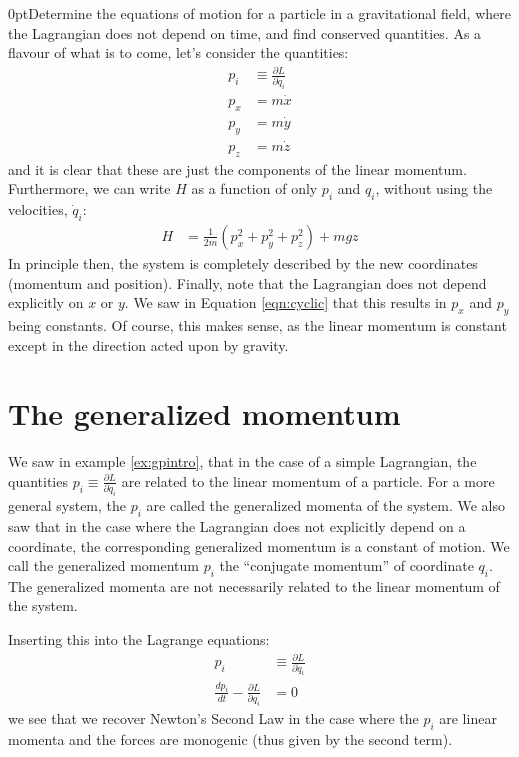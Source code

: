 \begin{example}{0pt}{Determine the equations of motion for a particle in a gravitational field, where the Lagrangian does not depend on time, and find conserved quantities.}{}
As a flavour of what is to come, let's consider the quantities:
\begin{align*}
p_i&\equiv \frac{\partial L}{\partial \dot{q}_i}\\
p_x&=m\dot{x}\\
p_y&=m\dot{y}\\
p_z&=m\dot{z}
\end{align*}
and it is clear that these are just the components of the linear momentum. Furthermore, we can write $H$ as a function of only $p_i$ and $q_i$, without using the velocities, $\dot{q}_i$:
\begin{align*}
H&=\frac{1}{2m}(p_x^2+p_y^2+p_z^2)+mgz
\end{align*}
In principle then, the system is completely described by the new coordinates (momentum and position). Finally, note that the Lagrangian does not depend explicitly on $x$ or $y$. We saw in Equation \ref{eqn:cyclic} that this results in $p_x$ and $p_y$ being constants. Of course, this makes sense, as the linear momentum is constant except in the direction acted upon by gravity.
\label{ex:gpintro}
\end{example}

\section{The generalized momentum}
We saw in example \ref{ex:gpintro}, that in the case of a simple Lagrangian, the quantities $p_i\equiv\frac{\partial L}{\partial \dot{q}_i}$ are related to the linear momentum of a particle. For a more general system, the $p_i$ are called the generalized momenta of the system. We also saw that in the case where the Lagrangian does not explicitly depend on a coordinate, the corresponding generalized momentum is a constant of motion. We call the generalized momentum $p_i$ the ``conjugate momentum'' of coordinate $q_i$. The generalized momenta are not necessarily related to the linear momentum of the system.

Inserting this into the Lagrange equations:
\begin{align}
p_i&\equiv\frac{\partial L}{\partial \dot{q}_i}\\
\frac{dp_i}{dt}-\frac{\partial L}{\partial q_i}&=0
\end{align}
we see that we recover Newton's Second Law in the case where the $p_i$ are linear momenta and the forces are monogenic (thus given by the second term).

